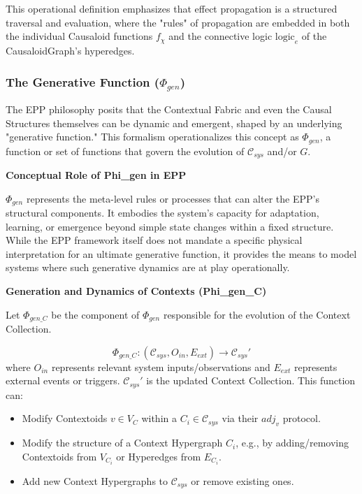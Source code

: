  This operational definition emphasizes that effect propagation is a structured traversal and evaluation, where the "rules" of propagation are embedded in both the individual Causaloid functions \(f_\chi\) and the connective logic \(\text{logic}_e\) of the CausaloidGraph's hyperedges.\newline

    
\subsubsection[The Generative Function (Phi\_gen)]{The Generative Function (\(\Phi_{gen}\))}
    \label{ssec:generative_function_formal_merged} 
    
    The EPP philosophy posits that the Contextual Fabric and even the Causal Structures themselves can be dynamic and emergent, shaped by an underlying "generative function." This formalism operationalizes this concept as \(\Phi_{gen}\), a function or set of functions that govern the evolution of \(\mathcal{C}_{sys}\) and/or \(G\).


\textbf{Conceptual Role of Phi\_gen in EPP}

        
\(\Phi_{gen}\) represents the meta-level rules or processes that can alter the EPP's structural components. It embodies the system's capacity for adaptation, learning, or emergence beyond simple state changes within a fixed structure. While the EPP framework itself does not mandate a specific physical interpretation for an ultimate generative function, it provides the means to model systems where such generative dynamics are at play operationally.

        
\textbf{Generation and Dynamics of Contexts (Phi\_gen\_C)}
  
Let \(\Phi_{gen\_C}\) be the component of \(\Phi_{gen}\) responsible for the evolution of the Context Collection.\newline
        
\begin{definition}
\label{def:epp_gen_function}  
        \[ \Phi_{gen\_C} : (\mathcal{C}_{sys}, O_{in}, E_{ext}) \to \mathcal{C}_{sys}' \]
        where \(O_{in}\) represents relevant system inputs/observations and \(E_{ext}\) represents external events or triggers. \(\mathcal{C}_{sys}'\) is the updated Context Collection.
        This function can:
        \begin{itemize}
            \item Modify Contextoids \(v \in V_C\) within a \(C_i \in \mathcal{C}_{sys}\) via their \(adj_v\) protocol.
            \item Modify the structure of a Context Hypergraph \(C_i\), e.g., by adding/removing Contextoids from \(V_{C_i}\) or Hyperedges from \(E_{C_i}\).
            \item Add new Context Hypergraphs to \(\mathcal{C}_{sys}\) or remove existing ones.
        \end{itemize}
 \end{definition}   
         
